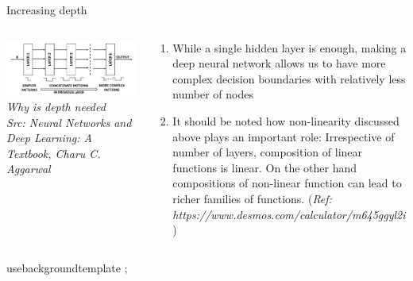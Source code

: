 \begin{frame}{Increasing depth}
  \begin{columns}[T]
  \begin{column}{0.4\textwidth}
    \includegraphics[width=\textwidth]{images/depth.png}
    \tiny{\textit{Why is depth needed\\ Src: Neural Networks and Deep Learning: A Textbook, Charu C. Aggarwal}}
  \end{column}
  \begin{column}{0.6\textwidth}
  \begin{enumerate}[$\bullet$]
  \item While a single hidden layer is enough, making a deep neural network allows us to have more complex decision boundaries with relatively less number of nodes\pause
  \item It should be noted how non-linearity discussed above plays an important role: Irrespective of number of layers, composition of linear functions is linear. On the other hand compositions of non-linear function can lead to richer families of functions. (\textit{Ref: https://www.desmos.com/calculator/m645ggyl2i})
  \end{enumerate}
  \end{column}
\end{columns}
\end{frame}



usebackgroundtemplate{%
 ;
}
\begin{frame}
\end{frame}

